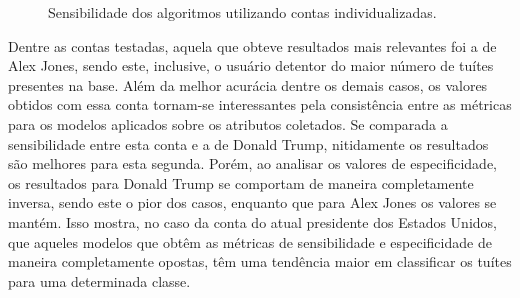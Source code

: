 \documentclass[oneside,openright,12pt]{ufsm_2015} %
\begin{document}
    \begin{figure}[!ht]
    \caption{Sensibilidade dos algoritmos utilizando contas individualizadas.}
    \centering
    \label{tik:sensibilidade-individual}
    \end{figure}
    
    \par Dentre as contas testadas, aquela que obteve resultados mais relevantes foi a de Alex Jones, sendo este, inclusive, o usuário detentor do maior número de tuítes presentes na base. Além da melhor acurácia dentre os demais casos, os valores obtidos com essa conta tornam-se interessantes pela consistência entre as métricas para os modelos aplicados sobre os atributos coletados. Se comparada a sensibilidade entre esta conta e a de Donald Trump, nitidamente os resultados são melhores para esta segunda. Porém, ao analisar os valores de especificidade, os resultados para Donald Trump se comportam de maneira completamente inversa, sendo este o pior dos casos, enquanto que para Alex Jones os valores se mantém. Isso mostra, no caso da conta do atual presidente dos Estados Unidos, que aqueles modelos que obtêm as métricas de sensibilidade e especificidade de maneira completamente opostas, têm uma tendência maior em classificar os tuítes para uma determinada classe.
    
\end{document}

